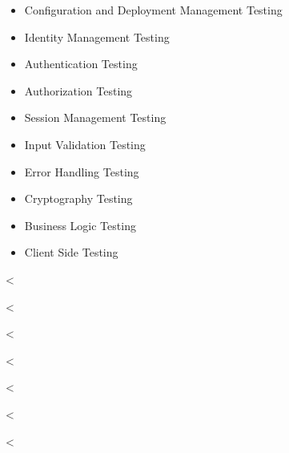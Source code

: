     \begin{itemize}
      \item Configuration and Deployment Management Testing
      \item Identity Management Testing
      \item Authentication Testing
      \item Authorization Testing
      \item Session Management Testing
      \item Input Validation Testing
      \item Error Handling Testing
      \item Cryptography Testing
      \item Business Logic Testing
      \item Client Side Testing
    \end{itemize}

  <%

    <%

  <%

    <%

  <%

    <%


<%
